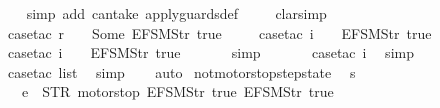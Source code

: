 \begin{isabellebody}
%
\isadelimproof
\ \ %
\endisadelimproof
%
\isatagproof
{}\isamarkupfalse%
\ {\isacharparenleft}simp\ add{\isacharcolon}\ can{\isacharunderscore}take\ apply{\isacharunderscore}guards{\isacharunderscore}def\ {\isacharparenright}\isanewline
\ \ \isamarkupfalse%
\ clarsimp\isanewline
\ \ \isamarkupfalse%
\ {\isacharparenleft}case{\isacharunderscore}tac\ {\isachardoublequoteopen}r\ {\isachardollar}\ {}\ {\isacharequal}\ Some\ {\isacharparenleft}EFSM{\isachardot}Str\ {\isacharprime}{\isacharprime}true{\isacharprime}{\isacharprime}{\isacharparenright}{\isachardoublequoteclose}{\isacharparenright}\isanewline
\ \ \ \isamarkupfalse%
\ {\isacharparenleft}case{\isacharunderscore}tac\ {\isachardoublequoteopen}i\ {\isacharbang}\ {}\ {\isacharequal}\ {\isacharparenleft}EFSM{\isachardot}Str\ {\isacharprime}{\isacharprime}true{\isacharprime}{\isacharprime}{\isacharparenright}{\isachardoublequoteclose}{\isacharparenright}\isanewline
\ \ \ \ \isamarkupfalse%
\ {\isacharparenleft}case{\isacharunderscore}tac\ {\isachardoublequoteopen}i\ {\isacharbang}\ {}\ {\isacharequal}\ {\isacharparenleft}EFSM{\isachardot}Str\ {\isacharprime}{\isacharprime}true{\isacharprime}{\isacharprime}{\isacharparenright}{\isachardoublequoteclose}{\isacharparenright}\isanewline
\ \ \ \ \ \isamarkupfalse%
\ simp\isanewline
\ \ \ \ \ \isamarkupfalse%
\ {\isacharparenleft}case{\isacharunderscore}tac\ i{\isacharparenright}\ \isamarkupfalse%
\ simp\isanewline
\ \ \ \ \ \isamarkupfalse%
\ {\isacharparenleft}case{\isacharunderscore}tac\ list{\isacharparenright}\ \isamarkupfalse%
\ simp\isanewline
\ \ \isamarkupfalse%
\ auto%
\endisatagproof
{\isafoldproof}%
%
\isadelimproof
\isanewline
%
\endisadelimproof
\isanewline
{}\isamarkupfalse%
\ not{\isacharunderscore}motorstop{\isacharunderscore}step{\isacharunderscore}state{\isacharcolon}\isanewline
\ \ {\isachardoublequoteopen}s\ {\isasymin}\ {\isacharbraceleft}{}{\isacharcomma}\ {}{\isacharcomma}\ {}{\isacharcomma}\ {}{\isacharbraceright}\ {\isasymLongrightarrow}\isanewline
\ \ \ e\ {\isasymnoteq}\ {\isacharparenleft}STR\ {\isacharprime}{\isacharprime}motorstop{\isacharprime}{\isacharprime}{\isacharcomma}\ {\isacharbrackleft}EFSM{\isachardot}Str\ {\isacharprime}{\isacharprime}true{\isacharprime}{\isacharprime}{\isacharcomma}\ EFSM{\isachardot}Str\ {\isacharprime}{\isacharprime}true{\isacharprime}{\isacharprime}{\isacharbrackright}{\isacharparenright}\ {\isasymLongrightarrow}\isanewline

\end{isabellebody}
